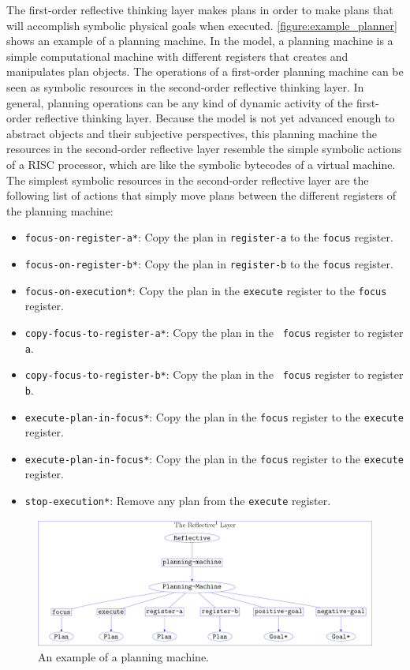 The first-order reflective thinking layer makes plans in order to make
plans that will accomplish symbolic physical goals when executed.
{\mbox{\autoref{figure:example_planner}}} shows an example of a
planning machine.  In the model, a planning machine is a simple
computational machine with different registers that creates and
manipulates plan objects.  The operations of a first-order planning
machine can be seen as symbolic resources in the second-order
reflective thinking layer.  In general, planning operations can be any
kind of dynamic activity of the first-order reflective thinking layer.
Because the model is not yet advanced enough to abstract objects and
their subjective perspectives, this planning machine the resources in
the second-order reflective layer resemble the simple symbolic actions
of a RISC processor, which are like the symbolic bytecodes of a
virtual machine.  The simplest symbolic resources in the second-order
reflective layer are the following list of actions that simply move
plans between the different registers of the planning machine:
\begin{itemize}
\item {\tt focus-on-register-a*}: Copy the plan in {\tt register-a} to
  the {\tt focus} register.
\item {\tt focus-on-register-b*}: Copy the plan in {\tt register-b} to
  the {\tt focus} register.
\item {\tt focus-on-execution*}: Copy the plan in the {\tt execute}
  register to the {\tt focus} register.
\item {\tt copy-focus-to-register-a*}: Copy the plan in the {\tt
  focus} register to register {\tt a}.
\item {\tt copy-focus-to-register-b*}: Copy the plan in the {\tt
  focus} register to register {\tt b}.
\item {\tt execute-plan-in-focus*}: Copy the plan in the {\tt focus}
  register to the {\tt execute} register.
\item {\tt execute-plan-in-focus*}: Copy the plan in the {\tt focus}
  register to the {\tt execute} register.
\item {\tt stop-execution*}: Remove any plan from the {\tt execute}
  register.
\end{itemize}
\begin{figure}
\includegraphics[width=12cm]{gfx/example_planner}
\caption[An example of a planning machine.]{An example of a planning
  machine.}
\label{figure:example_planner}
\end{figure}
